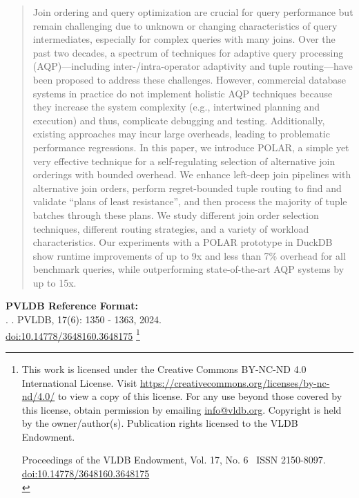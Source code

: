 \documentclass[sigconf,nonacm,pdfa,screen]{acmart}
\newcommand\vldbdoi{10.14778/3648160.3648175}
\newcommand\vldbpages{1350 - 1363}
\newcommand\vldbvolume{17}
\newcommand\vldbissue{6}
\newcommand\vldbyear{2024}
\newcommand\vldbauthors{\authors}
\newcommand\vldbtitle{\shorttitle}
\newcommand\vldbpagestyle{empty}
\begin{document}
\begin{abstract}
Join ordering and query optimization are crucial for query performance but remain challenging due to unknown or changing characteristics of query intermediates, especially for complex queries with many joins.
Over the past two decades, a spectrum of techniques for adaptive query processing (AQP)---including inter-/intra-operator adaptivity and tuple routing---have been proposed to address these challenges. However, commercial database systems in practice do not implement holistic AQP techniques because they increase the system complexity (e.g., intertwined planning and execution) and thus, complicate debugging and testing. Additionally, existing approaches may incur large overheads, leading to problematic performance regressions.
In this paper, we introduce POLAR, a simple yet very effective technique for a self-regulating selection of alternative join orderings with bounded overhead. We enhance left-deep join pipelines with alternative join orders, perform regret-bounded tuple routing to find and validate \enquote{plans of least resistance}, and then process the majority of tuple batches through these plans. We study different join order selection techniques, different routing strategies, and a variety of workload characteristics.
Our experiments with a POLAR prototype in DuckDB show runtime improvements of up to 9x and less than 7\% overhead for all benchmark queries, while outperforming state-of-the-art AQP systems by up to 15x.
\end{abstract}

\maketitle

\pagestyle{\vldbpagestyle}
\begingroup\small\noindent\raggedright\textbf{PVLDB Reference Format:}\\
\vldbauthors. \vldbtitle. PVLDB, \vldbvolume(\vldbissue): \vldbpages, \vldbyear.\\
\href{https://doi.org/\vldbdoi}{doi:\vldbdoi}
\endgroup
\begingroup
\renewcommand\thefootnote{}\footnote{\noindent
This work is licensed under the Creative Commons BY-NC-ND 4.0 International License. Visit \url{https://creativecommons.org/licenses/by-nc-nd/4.0/} to view a copy of this license. For any use beyond those covered by this license, obtain permission by emailing \href{mailto:info@vldb.org}{info@vldb.org}. Copyright is held by the owner/author(s). Publication rights licensed to the VLDB Endowment. \\
\raggedright Proceedings of the VLDB Endowment, Vol. \vldbvolume, No. \vldbissue\ %
ISSN 2150-8097. \\
\href{https://doi.org/\vldbdoi}{doi:\vldbdoi} \\
}\addtocounter{footnote}{-1}\endgroup
\end{document}
